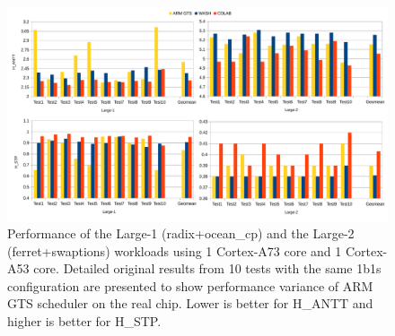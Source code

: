 

\begin{figure}
\centering
\includegraphics[scale=0.6]{figures/1b1s.pdf}
\caption{Performance of the Large-1 (radix+ocean\_cp) and the Large-2 (ferret+swaptions) workloads using 1 Cortex-A73 core and 1 Cortex-A53 core. Detailed original results from 10 tests with the same 1b1s configuration are presented to show performance variance of ARM GTS scheduler on the real chip. Lower is better for H\_ANTT and higher is better for H\_STP.}
\label{1b1s}
\end{figure}

